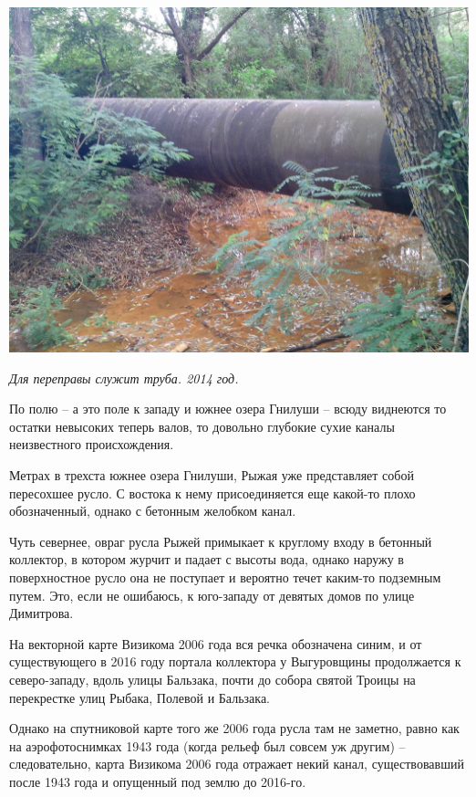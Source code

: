 \begin{center}
\includegraphics[width=\linewidth]{chast-gorodki/rud/s_IMG_20140806_140003.jpg}

\textit{Для переправы служит труба. 2014 год.}
\end{center}

По полю – а это поле к западу и южнее озера Гнилуши – всюду виднеются то остатки невысоких теперь валов, то довольно глубокие сухие каналы неизвестного происхождения.

Метрах в трехста южнее озера Гнилуши, Рыжая уже представляет собой пересохшее русло. С востока к нему присоединяется еще какой-то плохо обозначенный, однако с бетонным желобком канал.

Чуть севернее, овраг русла Рыжей примыкает к круглому входу в бетонный коллектор, в котором журчит и падает с высоты вода, однако наружу в поверхностное русло она не поступает и вероятно течет каким-то подземным путем. Это, если не ошибаюсь, к юго-западу от девятых домов по улице Димитрова.

На векторной карте Визикома 2006 года вся речка обозначена синим, и от существующего в 2016 году портала коллектора у Выгуровщины продолжается к северо-западу, вдоль улицы Бальзака, почти до собора святой Троицы на перекрестке улиц Рыбака, Полевой и Бальзака.

Однако на спутниковой карте того же 2006 года русла там не заметно, равно как на аэрофотоснимках 1943 года (когда рельеф был совсем уж другим) – следовательно, карта Визикома 2006 года отражает некий канал, существовавший после 1943 года и опущенный под землю до 2016-го.

